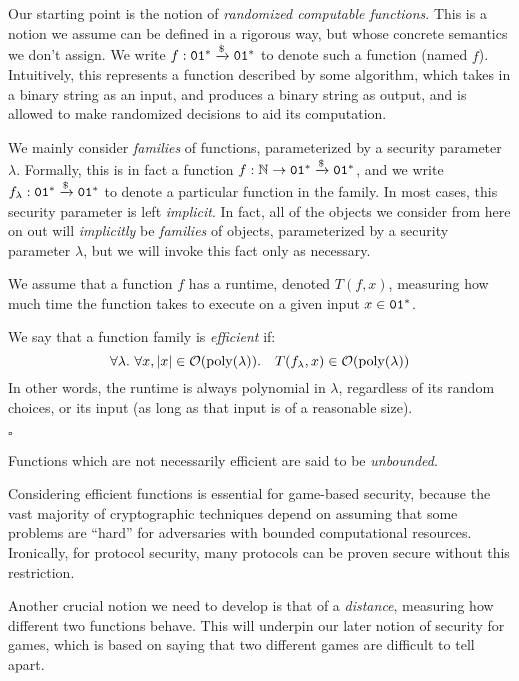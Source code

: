 Our starting point is the notion of \emph{randomized computable functions}.
This is a notion we assume can be defined in a rigorous way, but whose
concrete semantics we don't assign.
We write $f : \texttt{01}^* \xrightarrow{\$} \texttt{01}^*$ to denote such a function (named $f$).
Intuitively, this represents a function described by some algorithm,
which takes in a binary string as an input, and produces a binary string
as output, and is allowed to make randomized decisions to aid its computation.

We mainly consider \emph{families} of functions,
parameterized by a security parameter $\lambda$.
Formally, this is in fact a function $f : \mathbb{N} \to \texttt{01}^* \xrightarrow{\$} \texttt{01}^*$,
and we write $f_{\lambda} : \texttt{01}^* \xrightarrow{\$} \texttt{01}^*$ to denote a particular
function in the family.
In most cases, this security parameter is left \emph{implicit}.
In fact, all of the objects we consider from here on out will \emph{implicitly}
be \emph{families} of objects, parameterized by a security parameter $\lambda$,
but we will invoke this fact only as necessary.

\begin{definition}
    We assume that a function $f$ has a runtime, denoted $T(f, x)$,
    measuring how much time the function takes to execute on a given input $x \in \texttt{01}^*$.

    We say that a function family is \emph{efficient} if:
    $$
    \forall \lambda.\ \forall x, |x| \in \mathcal{O}(\text{poly}(\lambda)).\quad T(f_\lambda, x) \in \mathcal{O}(\text{poly}(\lambda))
    $$
    In other words, the runtime is always polynomial in $\lambda$, regardless
    of its random choices, or its input (as long as that input is of a reasonable size).

    $\square$
\end{definition}

Functions which are not necessarily efficient are said to be \emph{unbounded}.

Considering efficient functions is essential for game-based security, because the vast majority
of cryptographic techniques depend on assuming that some problems are ``hard''
for adversaries with bounded computational resources.
Ironically, for protocol security, many protocols can be proven secure
without this restriction.

Another crucial notion we need to develop is that of a \emph{distance},
measuring how different two functions behave.
This will underpin our later notion of security for games,
which is based on saying that two different games are difficult
to tell apart.

